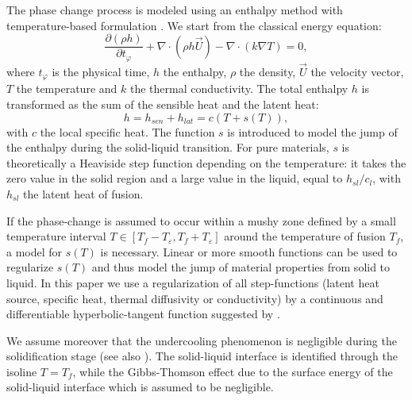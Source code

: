 The phase change process is modeled using an enthalpy method with temperature-based formulation  \citep{voller1987pcm,Cao1989,Cao1990}. We start from the classical energy equation:
\begin{equation}
\label{eq-energie}
   \frac{\partial (\rho h)}{\partial t_{\varphi}} + \nabla \cdot(\rho h \vec{U}) - \nabla \cdot (k \nabla T) = 0,
\end{equation}
where $t_{\varphi}$ is the physical time, $h$ the enthalpy, $\rho$ the density, $\vec{U}$  the velocity vector, $T$ the temperature and $k$ the thermal conductivity. 
The total enthalpy $h$ is transformed as the sum of the sensible heat and the latent heat:
\begin{equation}
\label{eq-enth-model}
  h = h_{sen} + h_{lat} = c ( T + s(T) ),
\end{equation} 
with $c$ the local specific heat. The function $s$ is introduced to model the jump of the enthalpy during the solid-liquid transition.  For pure materials, $s$ is theoretically  a Heaviside step function depending on the temperature: it takes the zero value in the solid region and a large value in the liquid, equal to $h_{sl}/c_l$, with $h_{sl}$ the latent heat of fusion. 

\noindent If the phase-change is assumed to occur within a mushy zone defined by a small temperature interval $  T \in [T_f - T_\varepsilon, T_f + T_\varepsilon] $ around the temperature of fusion $T_f$, a model for $s(T)$ is necessary. Linear  \citep{voller1987pcm,Wang2010} or more smooth functions \citep{dan-2014-JCP} can be used to regularize $s(T)$ and thus model the jump of material properties from solid to liquid.  In this paper we use a regularization of all step-functions (latent heat source, specific heat, thermal diffusivity or conductivity) by a continuous and differentiable hyperbolic-tangent function suggested by \cite{dan-2014-JCP}.

\noindent We assume moreover that the undercooling phenomenon is negligible during the solidification stage (see also \cite{wang2010numerical,kowalewski2004phase}).
The solid-liquid interface is identified through the isoline $T=T_f$, while the Gibbs-Thomson effect due to the surface energy of the solid-liquid interface which is assumed to be negligible.%

